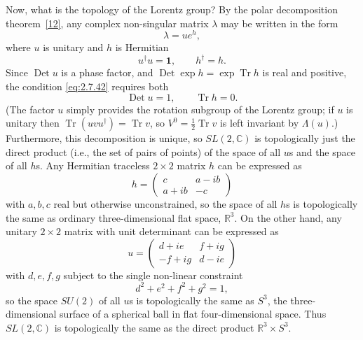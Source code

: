 Now, what is the topology of the Lorentz group? By the polar decomposition
theorem~\hyperref[ref:2.12]{[12]}, any complex non-singular matrix $\lambda$ may be
written in the form
\begin{equation*}
  \lambda=u e^h,
\end{equation*}
where $u$ is unitary and $h$ is Hermitian
\begin{equation*}
  u^\dagger u=\mathbf{1},
  \qquad
  h^\dagger=h.
\end{equation*}
Since $\operatorname{Det}u$ is a phase factor, and
$\operatorname{Det}\exp h=\exp\operatorname{Tr}h$ is real and positive, the
condition \eqref{eq:2.7.42} requires both
\begin{equation*}
  \operatorname{Det}u=1,
  \qquad
  \operatorname{Tr}h=0.
\end{equation*}
(The factor $u$ simply provides the rotation subgroup of the Lorentz group; if
$u$ is unitary then $\operatorname{Tr}(uvu^\dagger)=\operatorname{Tr}v$, so
$V^0=\tfrac12\operatorname{Tr}v$ is left invariant by $\Lambda(u)$.)
Furthermore, this decomposition is unique, so $SL(2,\mathbb{C})$ is topologically just
the direct product (i.e., the set of pairs of points) of the space of all $u$s
and the space of all $h$s. Any Hermitian traceless $2\times2$ matrix $h$ can be
expressed as
\begin{equation*}
  h=\begin{pmatrix}
    c & a-ib\\
    a+ib & -c
  \end{pmatrix}
\end{equation*}
with $a,b,c$ real but otherwise unconstrained, so the space of all $h$s is
topologically the same as ordinary three-dimensional flat space, $\mathbb{R}^3$. On the
other hand, any unitary $2\times2$ matrix with unit determinant can be expressed
as
\begin{equation*}
  u=\begin{pmatrix}
    d+ie & f+ig\\
    -f+ig & d-ie
  \end{pmatrix}
\end{equation*}
with $d,e,f,g$ subject to the single non-linear constraint
\begin{equation*}
  d^2+e^2+f^2+g^2=1,
\end{equation*}
so the space $SU(2)$ of all $u$s is topologically the same as $S^3$, the
three-dimensional surface of a spherical ball in flat four-dimensional space.
Thus $SL(2,\mathbb{C})$ is topologically the same as the direct product $\mathbb{R}^3\times S^3$.
